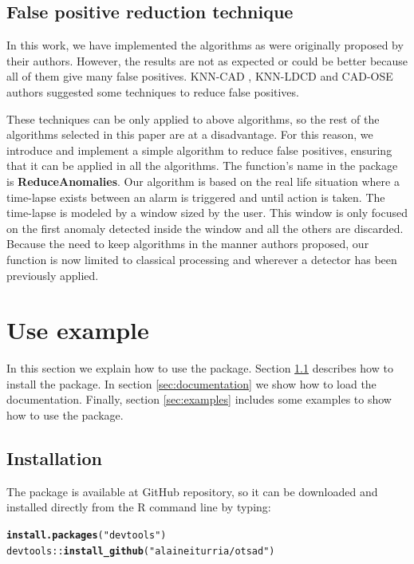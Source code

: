 \documentclass[a4paper]{article}\usepackage[]{graphicx}\usepackage[]{color}
\makeatletter
\newcommand{\hlstr}[1]{\textcolor[rgb]{0.192,0.494,0.8}{#1}}%
\newcommand{\hlopt}[1]{\textcolor[rgb]{0,0,0}{#1}}%
\newcommand{\hlstd}[1]{\textcolor[rgb]{0.345,0.345,0.345}{#1}}%
\newcommand{\hlkwd}[1]{\textcolor[rgb]{0.737,0.353,0.396}{\textbf{#1}}}%
\newenvironment{kframe}{%
 \def\at@end@of@kframe{}%
 \ifinner\ifhmode%
  \def\at@end@of@kframe{\end{minipage}}%
  \begin{minipage}{\columnwidth}%
 \fi\fi%
 \def\FrameCommand##1{\hskip\@totalleftmargin \hskip-\fboxsep
 \colorbox{shadecolor}{##1}\hskip-\fboxsep
     \hskip-\linewidth \hskip-\@totalleftmargin \hskip\columnwidth}%
 \MakeFramed {\advance\hsize-\width
   \@totalleftmargin\z@ \linewidth\hsize
   \@setminipage}}%
 {\par\unskip\endMakeFramed%
 \at@end@of@kframe}
\newenvironment{knitrout}{}{} %
\makeatother
\begin{document}
\subsection{False positive reduction technique} \label{sec:fp}

In this work, we have implemented the algorithms as were originally proposed by their authors. However, the results are not as expected or could be better because all of them give many false positives. KNN-CAD \cite{2016arXiv160804585B}, KNN-LDCD \cite{2017arXiv170603412I} and CAD-OSE \cite{2018-Smirnov-ContextualAnomalyDetector} authors suggested some techniques to reduce false positives.

These techniques can be only applied to above algorithms, so the rest of the algorithms selected in this paper are at a disadvantage. For this reason, we introduce and implement a simple algorithm to reduce false positives, ensuring that it can be applied in all the algorithms. The function's name in the package is \textbf{ReduceAnomalies}. Our algorithm is based on the real life situation where a time-lapse exists between an alarm is triggered and until action is taken. The time-lapse is modeled by a window sized by the user. This window is only focused on the first anomaly detected inside the window and all the others are discarded. Because the need to keep algorithms in the manner authors proposed, our function is now limited to classical processing and wherever a detector has been previously applied.

\section{Use example}\label{sec:examplesec}

In this section we explain how to use the package. Section \ref{sec:installation} describes  how to install the package. In section \ref{sec:documentation} we show how to load the documentation. Finally, section \ref{sec:examples} includes some examples to show how to use the package.

\subsection{Installation}\label{sec:installation}

The  package is available at GitHub repository, so it can be downloaded and installed directly from the R command line by typing:

\begin{knitrout}
\color{fgcolor}\begin{kframe}
\begin{alltt}
\hlkwd{install.packages}\hlstd{(}\hlstr{"devtools"}\hlstd{)}
\hlstd{devtools}\hlopt{::}\hlkwd{install_github}\hlstd{(}\hlstr{"alaineiturria/otsad"}\hlstd{)}
\end{alltt}
\end{kframe}
\end{knitrout}
\end{document}
